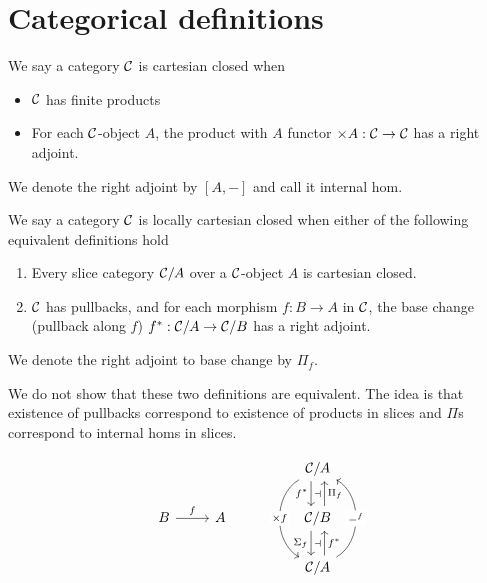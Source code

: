 \section{Categorical definitions}

\begin{dfn}
  We say a category $\mathcal{C}$ is cartesian closed when
  \begin{itemize}
    \item $\mathcal{C}$ has finite products
    \item For each $\mathcal{C}$-object $A$, the product with $A$ functor $\times A : \mathcal{C} \to \mathcal{C}$ has a right adjoint.
  \end{itemize}
  We denote the right adjoint by $[A,-]$ and call it internal hom.
\end{dfn}

\begin{dfn}
  We say a category $\mathcal{C}$ is locally cartesian closed when either of the following equivalent definitions hold
  \begin{enumerate}
    \item Every slice category $\mathcal{C} / A$ over a $\mathcal{C}$-object $A$ is cartesian closed.
    \item $\mathcal{C}$ has pullbacks, and for each morphism $f : B \to A$ in $\mathcal{C}$,
          the base change (pullback along $f$) $f^{*} : \mathcal{C} / A \to \mathcal{C} / B$ has a right adjoint.
  \end{enumerate}
  We denote the right adjoint to base change by $\Pi_{f}$.
\end{dfn}

We do not show that these two definitions are equivalent.
The idea is that existence of pullbacks correspond to existence of products in slices
and $\Pi$s correspond to internal homs in slices.

\[\begin{tikzcd}
	&&& {\CC/A} \\
	B & A && {\CC/B} \\
	&&& {\CC/A}
	\arrow[""{name=0, anchor=center, inner sep=0}, "{f^*}"', shift right=2, from=1-4, to=2-4]
	\arrow[""{name=1, anchor=center, inner sep=0}, "{\Pi_f}"', shift right=2, from=2-4, to=1-4]
	\arrow[""{name=2, anchor=center, inner sep=0}, "{\Si_f}"', shift right=2, from=2-4, to=3-4]
	\arrow[""{name=3, anchor=center, inner sep=0}, "{f^*}"', shift right=2, from=3-4, to=2-4]
	\arrow["{\times f}"{description}, bend left = {- 60}, from=1-4, to=3-4]
	\arrow["{-^f}"{description}, bend left = {- 60}, from=3-4, to=1-4]
	\arrow["f", from=2-1, to=2-2]
	\arrow["\dashv"{anchor=center}, draw=none, from=0, to=1]
	\arrow["\dashv"{anchor=center}, draw=none, from=2, to=3]
\end{tikzcd}\]

